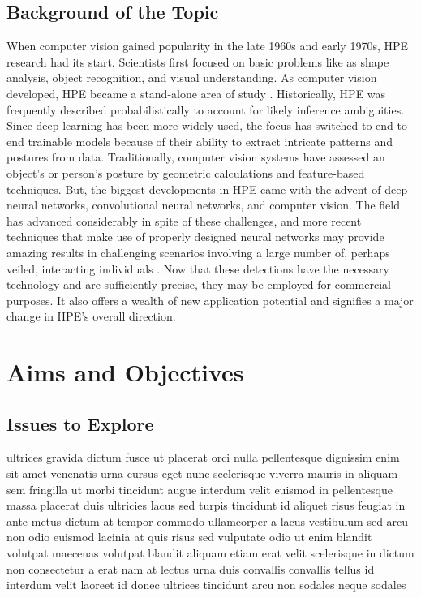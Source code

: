 \documentclass[runningheads]{llncs}
\begin{document}
    \subsection{Background of the Topic}
        When computer vision gained popularity in the late 1960s and early 1970s, HPE research had its start. Scientists first focused on basic problems like as shape analysis, object recognition, and visual understanding. As computer vision developed, HPE became a stand-alone area of study \parencite{Roboflow}. Historically, HPE was frequently described probabilistically to account for likely inference ambiguities. Since deep learning has been more widely used, the focus has switched to end-to-end trainable models because of their ability to extract intricate patterns and postures from data. Traditionally, computer vision systems have assessed an object's or person's posture by geometric calculations and feature-based techniques. But, the biggest developments in HPE came with the advent of deep neural networks, convolutional neural networks, and computer vision. The field has advanced considerably in spite of these challenges, and more recent techniques that make use of properly designed neural networks may provide amazing results in challenging scenarios involving a large number of, perhaps veiled, interacting individuals \parencite{liu2018recognizing}. Now that these detections have the necessary technology and are sufficiently precise, they may be employed for commercial purposes. It also offers a wealth of new application potential and signifies a major change in HPE's overall direction.



\section{Aims and Objectives}
    \subsection{Issues to Explore}
        ultrices gravida dictum fusce ut placerat orci nulla pellentesque dignissim enim sit amet venenatis urna cursus eget nunc scelerisque viverra mauris in aliquam sem fringilla ut morbi tincidunt augue interdum velit euismod in pellentesque massa placerat duis ultricies lacus sed turpis tincidunt id aliquet risus feugiat in ante metus dictum at tempor commodo ullamcorper a lacus vestibulum sed arcu non odio euismod lacinia at quis risus sed vulputate odio ut enim blandit volutpat maecenas volutpat blandit aliquam etiam erat velit scelerisque in dictum non consectetur a erat nam at lectus urna duis convallis convallis tellus id interdum velit laoreet id donec ultrices tincidunt arcu non sodales neque sodales
\end{document}
